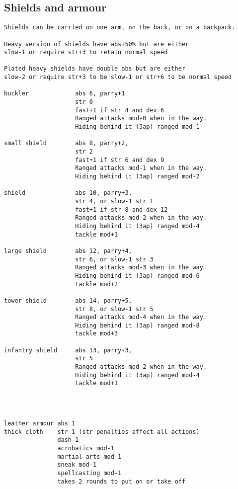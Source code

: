 \subsection*{Shields and armour}
\small
\begin{verbatim}
Shields can be carried on one arm, on the back, or on a backpack.

Heavy version of shields have abs+50% but are either
slow-1 or require str+3 to retain normal speed

Plated heavy shields have double abs but are either
slow-2 or require str+3 to be slow-1 or str+6 to be normal speed

buckler             abs 6, parry+1
                    str 0
                    fast+1 if str 4 and dex 6
                    Ranged attacks mod-0 when in the way.
                    Hiding behind it (3ap) ranged mod-1

small shield        abs 8, parry+2,
                    str 2
                    fast+1 if str 6 and dex 9
                    Ranged attacks mod-1 when in the way.
                    Hiding behind it (3ap) ranged mod-2

shield              abs 10, parry+3,
                    str 4, or slow-1 str 1
                    fast+1 if str 8 and dex 12
                    Ranged attacks mod-2 when in the way.
                    Hiding behind it (3ap) ranged mod-4
                    tackle mod+1

large shield        abs 12, parry+4,
                    str 6, or slow-1 str 3
                    Ranged attacks mod-3 when in the way.
                    Hiding behind it (3ap) ranged mod-6
                    tackle mod+2

tower shield        abs 14, parry+5,
                    str 8, or slow-1 str 5
                    Ranged attacks mod-4 when in the way.
                    Hiding behind it (3ap) ranged mod-8
                    tackle mod+3

infantry shield     abs 13, parry+3,
                    str 5
                    Ranged attacks mod-2 when in the way.
                    Hiding behind it (3ap) ranged mod-4
                    tackle mod+1




\end{verbatim} \goodbreak \begin{verbatim}
leather armour abs 1
thick cloth    str 1 (str penalties affect all actions)
               dash-1
               acrobatics mod-1
               martial arts mod-1
               sneak mod-1
               spellcasting mod-1
               takes 2 rounds to put on or take off


\end{verbatim}
